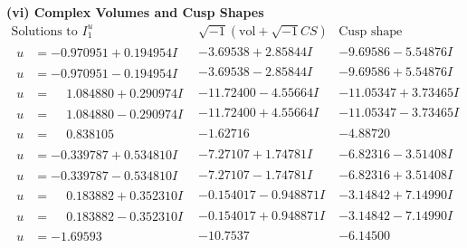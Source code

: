 \documentclass[1p]{elsarticle_modified}
\theoremstyle{definition}
\newcommand{\I}{\sqrt{-1}}
\begin{document}
\newpage\flushleft \textbf{(vi) Complex Volumes and Cusp Shapes}
$$\begin{array}{c|c|c}  
\text{Solutions to }I^u_{1}& \I (\text{vol} + \sqrt{-1}CS) & \text{Cusp shape}\\
 \hline 
\begin{aligned}
u &= -0.970951 + 0.194954 I\end{aligned}
 & -3.69538 + 2.85844 I & -9.69586 - 5.54876 I \\ \hline\begin{aligned}
u &= -0.970951 - 0.194954 I\end{aligned}
 & -3.69538 - 2.85844 I & -9.69586 + 5.54876 I \\ \hline\begin{aligned}
u &= \phantom{-}1.084880 + 0.290974 I\end{aligned}
 & -11.72400 - 4.55664 I & -11.05347 + 3.73465 I \\ \hline\begin{aligned}
u &= \phantom{-}1.084880 - 0.290974 I\end{aligned}
 & -11.72400 + 4.55664 I & -11.05347 - 3.73465 I \\ \hline\begin{aligned}
u &= \phantom{-}0.838105\phantom{ +0.000000I}\end{aligned}
 & -1.62716\phantom{ +0.000000I} & -4.88720\phantom{ +0.000000I} \\ \hline\begin{aligned}
u &= -0.339787 + 0.534810 I\end{aligned}
 & -7.27107 + 1.74781 I & -6.82316 - 3.51408 I \\ \hline\begin{aligned}
u &= -0.339787 - 0.534810 I\end{aligned}
 & -7.27107 - 1.74781 I & -6.82316 + 3.51408 I \\ \hline\begin{aligned}
u &= \phantom{-}0.183882 + 0.352310 I\end{aligned}
 & -0.154017 - 0.948871 I & -3.14842 + 7.14990 I \\ \hline\begin{aligned}
u &= \phantom{-}0.183882 - 0.352310 I\end{aligned}
 & -0.154017 + 0.948871 I & -3.14842 - 7.14990 I \\ \hline\begin{aligned}
u &= -1.69593\phantom{ +0.000000I}\end{aligned}
 & -10.7537\phantom{ +0.000000I} & -6.14500\phantom{ +0.000000I} \\ \hline\begin{aligned}

\end{aligned}
\end{array}$$
\end{document}
